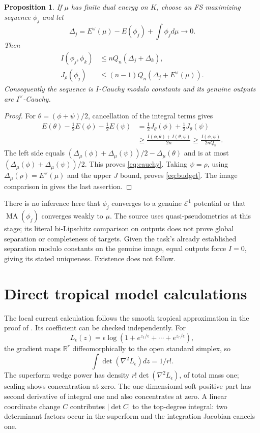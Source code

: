\documentclass[11pt]{article}
\newcommand{\MA}{\operatorname{MA}}
\newcommand{\EE}{\mathcal E^1}
\newtheorem{proposition}{Proposition}
\theoremstyle{remark}
\begin{document}
\begin{proposition}
If $\mu$ has finite dual energy on $K$, choose an FS maximizing sequence $\phi_j$ and let
\[
 \Delta_j=E^\vee(\mu)-E(\phi_j)+\int\phi_jd\mu\longrightarrow0.
\]
Then
\begin{align}
 I(\phi_j,\phi_k)&\le nQ_n(\Delta_j+\Delta_k),\label{eq:cauchy}\\
 J_\rho(\phi_j)&\le(n-1)Q_n(\Delta_j+E^\vee(\mu)).\label{eq:budget}
\end{align}
Consequently the sequence is $I$-Cauchy modulo constants and its genuine outputs are $I^\vee$-Cauchy.
\end{proposition}
\begin{proof}
For $\theta=(\phi+\psi)/2$, cancellation of the integral terms gives
\begin{align*}
 E(\theta)-\tfrac12E(\phi)-\tfrac12E(\psi)
 &=\tfrac12J_\theta(\phi)+\tfrac12J_\theta(\psi)\\
 &\ge\frac{I(\phi,\theta)+I(\theta,\psi)}{2n}
 \ge\frac{I(\phi,\psi)}{2nQ_n}.
\end{align*}
The left side equals $(\Delta_\mu(\phi)+\Delta_\mu(\psi))/2-\Delta_\mu(\theta)$ and is at most $(\Delta_\mu(\phi)+\Delta_\mu(\psi))/2$. This proves \eqref{eq:cauchy}. Taking $\psi=\rho$, using $\Delta_\mu(\rho)=E^\vee(\mu)$ and the upper $J$ bound, proves \eqref{eq:budget}. The image comparison in \cite[Lemma 7.7]{Wu24} gives the last assertion.
\end{proof}

There is no inference here that $\phi_j$ converges to a genuine $\EE$ potential or that $\MA(\phi_j)$ converges weakly to $\mu$. The source uses quasi-pseudometrics at this stage; its literal bi-Lipschitz comparison on outputs does not prove global separation or completeness of targets. Given the task's already established separation modulo constants on the genuine image, equal outputs force $I=0$, giving its stated uniqueness. Existence does not follow.

\section{Direct tropical model calculations}
The local current calculation follows the smooth tropical approximation in the proof of \cite[Corollary 5.7]{Wu21}. Its coefficient can be checked independently. For
\[
 L_\epsilon(z)=\epsilon\log(1+e^{z_1/\epsilon}+\cdots+e^{z_r/\epsilon}),
\]
the gradient maps $\mathbb R^r$ diffeomorphically to the open standard simplex, so
\[
 \int\det(\nabla^2L_\epsilon)dz=1/r!.
\]
The superform wedge power has density $r!\det(\nabla^2L_\epsilon)$, of total mass one; scaling shows concentration at zero. The one-dimensional soft positive part has second derivative of integral one and also concentrates at zero. A linear coordinate change $C$ contributes $|\det C|$ to the top-degree integral: two determinant factors occur in the superform and the integration Jacobian cancels one.
\end{document}
